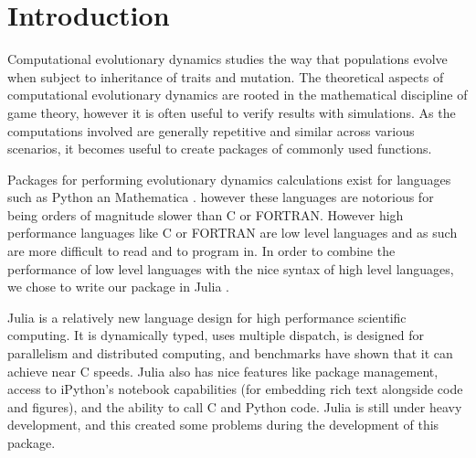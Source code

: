 \section{Introduction}

Computational evolutionary dynamics studies the way that populations evolve when subject to inheritance of traits and mutation.
The theoretical aspects of computational evolutionary dynamics are rooted in the mathematical discipline of game theory, however it is often useful to verify results with simulations.
As the computations involved are generally repetitive and similar across various scenarios, it becomes useful to create packages of commonly used functions.

Packages for performing evolutionary dynamics calculations exist for languages such as Python \cite{pyevodyn} an Mathematica \cite{dynamo}. however these languages are notorious for being orders of magnitude slower than C or FORTRAN.
However high performance languages like C or FORTRAN are low level languages and as such are more difficult to read and to program in.
In order to combine the performance of low level languages with the nice syntax of high level languages, we chose to write our package in Julia \cite{julia}.

Julia is a relatively new language design for high performance scientific computing.
It is dynamically typed, uses multiple dispatch, is designed for parallelism and distributed computing, and benchmarks have shown that it can achieve near C speeds.
Julia also has nice features like package management, access to iPython's notebook capabilities (for embedding rich text alongside code and figures), and the ability to call C and Python code.
Julia is still under heavy development, and this created some problems during the development of this package.
